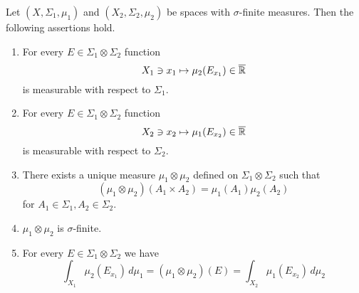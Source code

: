\begin{theorem}\label{theorem:fubinis_theorem_basic}
    Let $(X,\Sigma_1,\mu_1)$ and $(X_2,\Sigma_2,\mu_2)$ be spaces with $\sigma$-finite measures. Then the following assertions hold.
    \begin{enumerate}[label=\emph{\textbf{(\arabic*)}}, leftmargin=*]
        \item For every $E\in \Sigma_1\otimes \Sigma_2$ function
              $$X_1\ni x_1\mapsto \mu_2(E_{x_1})\in \overline{{\mathbb R}}$$
              is measurable with respect to $\Sigma_1$.
        \item For every $E\in \Sigma_1\otimes \Sigma_2$ function
              $$X_2\ni x_2\mapsto \mu_1(E_{x_2})\in \overline{{\mathbb R}}$$
              is measurable with respect to $\Sigma_2$.
        \item There exists a unique measure $\mu_1\otimes \mu_2$ defined on $\Sigma_1\otimes \Sigma_2$ such that
              $$\left(\mu_1\otimes \mu_2\right)\left(A_1\times A_2\right) = \mu_1(A_1)\mu_2(A_2)$$
              for $A_1\in \Sigma_1, A_2\in \Sigma_2$.
        \item $\mu_1\otimes \mu_2$ is $\sigma$-finite.
        \item For every $E\in \Sigma_1\otimes \Sigma_2$ we have
              $$\int_{X_1}\mu_2(E_{x_1})\,d\mu_1 = \left(\mu_1\otimes \mu_2\right)(E) = \int_{X_2}\mu_1(E_{x_2})\,d\mu_2$$
    \end{enumerate}
\end{theorem}
